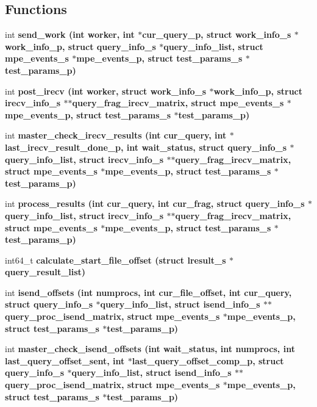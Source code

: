 \subsection*{Functions}
\begin{CompactItemize}
\item 
int \bf{send\_\-work} (int worker, int $\ast$cur\_\-query\_\-p, struct \bf{work\_\-info\_\-s} $\ast$work\_\-info\_\-p, struct \bf{query\_\-info\_\-s} $\ast$query\_\-info\_\-list, struct \bf{mpe\_\-events\_\-s} $\ast$mpe\_\-events\_\-p, struct \bf{test\_\-params\_\-s} $\ast$test\_\-params\_\-p)
\item 
int \bf{post\_\-irecv} (int worker, struct \bf{work\_\-info\_\-s} $\ast$work\_\-info\_\-p, struct \bf{irecv\_\-info\_\-s} $\ast$$\ast$query\_\-frag\_\-irecv\_\-matrix, struct \bf{mpe\_\-events\_\-s} $\ast$mpe\_\-events\_\-p, struct \bf{test\_\-params\_\-s} $\ast$test\_\-params\_\-p)
\item 
int \bf{master\_\-check\_\-irecv\_\-results} (int cur\_\-query, int $\ast$last\_\-irecv\_\-result\_\-done\_\-p, int wait\_\-status, struct \bf{query\_\-info\_\-s} $\ast$query\_\-info\_\-list, struct \bf{irecv\_\-info\_\-s} $\ast$$\ast$query\_\-frag\_\-irecv\_\-matrix, struct \bf{mpe\_\-events\_\-s} $\ast$mpe\_\-events\_\-p, struct \bf{test\_\-params\_\-s} $\ast$test\_\-params\_\-p)
\item 
int \bf{process\_\-results} (int cur\_\-query, int cur\_\-frag, struct \bf{query\_\-info\_\-s} $\ast$query\_\-info\_\-list, struct \bf{irecv\_\-info\_\-s} $\ast$$\ast$query\_\-frag\_\-irecv\_\-matrix, struct \bf{mpe\_\-events\_\-s} $\ast$mpe\_\-events\_\-p, struct \bf{test\_\-params\_\-s} $\ast$test\_\-params\_\-p)
\item 
int64\_\-t \bf{calculate\_\-start\_\-file\_\-offset} (struct \bf{lresult\_\-s} $\ast$query\_\-result\_\-list)
\item 
int \bf{isend\_\-offsets} (int numprocs, int cur\_\-file\_\-offset, int cur\_\-query, struct \bf{query\_\-info\_\-s} $\ast$query\_\-info\_\-list, struct \bf{isend\_\-info\_\-s} $\ast$$\ast$query\_\-proc\_\-isend\_\-matrix, struct \bf{mpe\_\-events\_\-s} $\ast$mpe\_\-events\_\-p, struct \bf{test\_\-params\_\-s} $\ast$test\_\-params\_\-p)
\item 
int \bf{master\_\-check\_\-isend\_\-offsets} (int wait\_\-status, int numprocs, int last\_\-query\_\-offset\_\-sent, int $\ast$last\_\-query\_\-offset\_\-comp\_\-p, struct \bf{query\_\-info\_\-s} $\ast$query\_\-info\_\-list, struct \bf{isend\_\-info\_\-s} $\ast$$\ast$query\_\-proc\_\-isend\_\-matrix, struct \bf{mpe\_\-events\_\-s} $\ast$mpe\_\-events\_\-p, struct \bf{test\_\-params\_\-s} $\ast$test\_\-params\_\-p)
$$
\end{CompactItemize}
